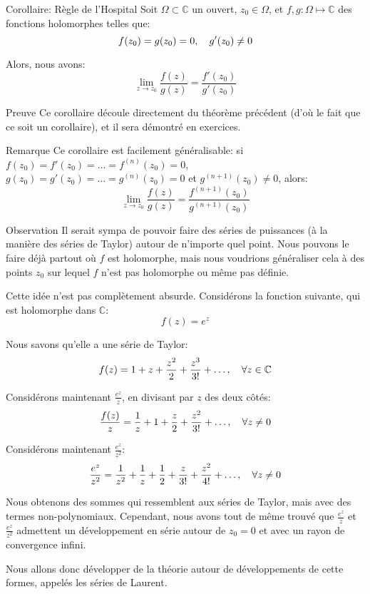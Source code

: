 \documentclass[a4paper]{article}
\begin{document}
\begin{parag}{Corollaire: Règle de l'Hospital}
    Soit $\Omega \subset \mathbb{C}$ un ouvert, $z_0 \in \Omega$, et $f, g : \Omega \mapsto\mathbb{C}$ des fonctions holomorphes telles que: 
    \[f\left(z_0\right) = g\left(z_0\right) = 0, \mathspace g'\left(z_0\right) \neq 0\]
    
    Alors, nous avons: 
    \[\lim_{z \to z_0} \frac{f\left(z\right)}{g\left(z\right)} = \frac{f'\left(z_0\right)}{g'\left(z_0\right)}\]

    \begin{subparag}{Preuve}
        Ce corollaire découle directement du théorème précédent (d'où le fait que ce soit un corollaire), et il sera démontré en exercices.
    \end{subparag}
    
    \begin{subparag}{Remarque}
        Ce corollaire est facilement généralisable: si $f\left(z_0\right) = f'\left(z_0\right) = \ldots = f^{\left(n\right)}\left(z_0\right) = 0$, $g\left(z_0\right) = g'\left(z_0\right) = \ldots = g^{\left(n\right)}\left(z_0\right) = 0$ et $g^{\left(n+1\right)}\left(z_0\right) \neq 0$, alors:
    \[\lim_{z \to z_0} \frac{f\left(z\right)}{g\left(z\right)} = \frac{f^{\left(n+1\right)}\left(z_0\right)}{g^{\left(n+1\right)}\left(z_0\right)}\]
    \end{subparag}
\end{parag}

\begin{parag}{Observation}
    Il serait sympa de pouvoir faire des séries de puissances (à la manière des séries de Taylor) autour de n'importe quel point. Nous pouvons le faire déjà partout où $f$ est holomorphe, mais nous voudrions généraliser cela à des points $z_0$ sur lequel $f$ n'est pas holomorphe ou même pas définie.

    Cette idée n'est pas complètement absurde. Considérons la fonction suivante, qui est holomorphe dans $\mathbb{C}$: 
    \[f\left(z\right) = e^{z}\]
    
    Nous savons qu'elle a une série de Taylor: 
    \[f\left(z\right) = 1 + z + \frac{z^2}{2} + \frac{z^3}{3!} + \ldots, \mathspace \forall z \in \mathbb{C}\]
    
    Considérons maintenant $\frac{e^z}{z}$, en divisant par $z$ des deux côtés: 
    \[\frac{f\left(z\right)}{z} = \frac{1}{z} + 1 + \frac{z}{2} + \frac{z^2}{3!} + \ldots, \mathspace \forall z \neq 0\]
    
    Considérons maintenant $\frac{e^z}{z^2}$: 
    \[\frac{e^z}{z^2} = \frac{1}{z^2} + \frac{1}{z} + \frac{1}{2} + \frac{z}{3!} + \frac{z^2}{4!} + \ldots, \quad \forall z \neq 0\]
    
    Nous obtenons des sommes qui ressemblent aux séries de Taylor, mais avec des termes non-polynomiaux. Cependant, nous avons tout de même trouvé que $\frac{e^z}{z}$ et $\frac{e^z}{z^2}$ admettent un développement en série autour de $z_0 = 0$ et avec un rayon de convergence infini.

    Nous allons donc développer de la théorie autour de développements de cette formes, appelés les séries de Laurent.
\end{parag}
\end{document}
